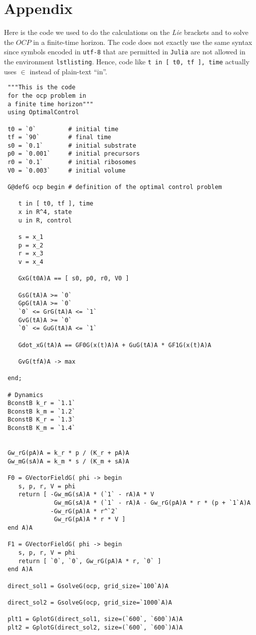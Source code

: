 \chapter{Appendix}
\label{chapter:appendix}
Here is the code we used to do the calculations on the \textit{Lie} brackets and to solve the $OCP$ in a finite-time horizon. The code does not exactly use the same syntax since symbols encoded in \verb|utf-8| that are permitted in \verb|Julia| are not allowed in the environment \verb|lstlisting|. Hence, code like \verb|t in [ t0, tf ], time| actually uses $\in$ instead of plain-text ``in''.

\begin{lstlisting}
 """This is the code 
 for the ocp problem in 
 a finite time horizon"""
 using OptimalControl
 
 t0 = `0`         # initial time
 tf = `90`        # final time
 s0 = `0.1`       # initial substrate
 p0 = `0.001`     # initial precursors
 r0 = `0.1`       # initial ribosomes
 V0 = `0.003`     # initial volume

 G@defG ocp begin # definition of the optimal control problem

    t in [ t0, tf ], time
    x in R^4, state 
    u in R, control

    s = x_1
    p = x_2
    r = x_3
    v = x_4

    GxG(t0A)A == [ s0, p0, r0, V0 ]
    
    GsG(tA)A >= `0`
    GpG(tA)A >= `0`
    `0` <= GrG(tA)A <= `1`
    GvG(tA)A >= `0`
    `0` <= GuG(tA)A <= `1`

    Gdot_xG(tA)A == GF0G(x(t)A)A + GuG(tA)A * GF1G(x(t)A)A

    GvG(tfA)A -> max

 end;

 # Dynamics
 BconstB k_r = `1.1`
 BconstB k_m = `1.2`
 BconstB K_r = `1.3`
 BconstB K_m = `1.4`


 Gw_rG(pA)A = k_r * p / (K_r + pA)A
 Gw_mG(sA)A = k_m * s / (K_m + sA)A

 F0 = GVectorFieldG( phi -> begin
    s, p, r, V = phi
    return [ -Gw_mG(sA)A * (`1` - rA)A * V
              Gw_mG(sA)A * (`1` - rA)A - Gw_rG(pA)A * r * (p + `1`A)A
             -Gw_rG(pA)A * r^`2`
              Gw_rG(pA)A * r * V ]
 end A)A

 F1 = GVectorFieldG( phi -> begin
    s, p, r, V = phi
    return [ `0`, `0`, Gw_rG(pA)A * r, `0` ]
 end A)A

 direct_sol1 = GsolveG(ocp, grid_size=`100`A)A

 direct_sol2 = GsolveG(ocp, grid_size=`1000`A)A

 plt1 = GplotG(direct_sol1, size=(`600`, `600`)A)A
 plt2 = GplotG(direct_sol2, size=(`600`, `600`)A)A

\end{lstlisting}

